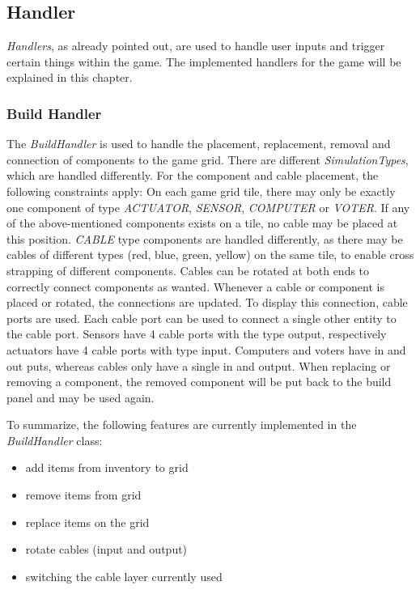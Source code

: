\subsection{Handler}\label{subsec:handler}
\textit{Handlers}, as already pointed out, are used to handle user inputs and trigger certain things within the game.
The implemented handlers for the game will be explained in this chapter.
\subsubsection{Build Handler}\label{subsubsec:build-handler}
The \textit{BuildHandler} is used to handle the placement, replacement, removal and connection of components to the game grid.
There are different \textit{SimulationTypes}, which are handled differently.
For the component and cable placement, the following constraints apply:
On each game grid tile, there may only be exactly one component of type \textit{ACTUATOR}, \textit{SENSOR}, \textit{COMPUTER} or \textit{VOTER}.
If any of the above-mentioned components exists on a tile, no cable may be placed at this position.
\textit{CABLE} type components are handled differently, as there may be cables of different types (red, blue, green, yellow) on the same tile, to enable
cross strapping of different components.
Cables can be rotated at both ends to correctly connect components as wanted.
Whenever a cable or component is placed or rotated, the connections are updated.
To display this connection, cable ports are used.
Each cable port can be used to connect a single other entity to the cable port.
Sensors have 4 cable ports with the type output, respectively actuators have 4 cable ports with type input.
Computers and voters have in and out puts, whereas cables only have a single in and output.
When replacing or removing a component, the removed component will be put back to the build panel and may be used again.

To summarize, the following features are currently implemented in the \textit{BuildHandler} class:
\begin{itemize}
    \item add items from inventory to grid
    \item remove items from grid
    \item replace items on the grid
    \item rotate cables (input and output)
    \item switching the cable layer currently used
\end{itemize}
